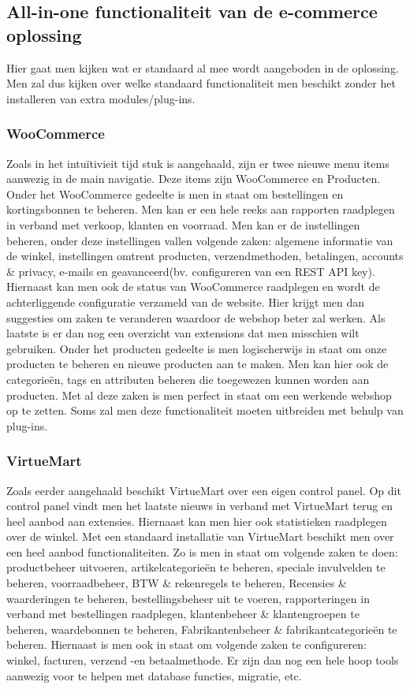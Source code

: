 \subsection{All-in-one functionaliteit van de e-commerce oplossing}
Hier gaat men kijken wat er standaard al mee wordt aangeboden in de oplossing. Men zal dus kijken over welke standaard functionaliteit men beschikt zonder het installeren van extra modules/plug-ins.
\subsubsection{WooCommerce}
Zoals in het intuïtivieit tijd stuk is aangehaald, zijn er twee nieuwe menu items aanwezig in de main navigatie. Deze items zijn WooCommerce en Producten. Onder het WooCommerce gedeelte is men in staat om bestellingen en kortingsbonnen te beheren. Men kan er een hele reeks aan rapporten raadplegen in verband met verkoop, klanten en voorraad. Men kan er de instellingen beheren, onder deze instellingen vallen volgende zaken: algemene informatie van de winkel, instellingen omtrent producten, verzendmethoden, betalingen, accounts \& privacy, e-mails en geavanceerd(bv. configureren van een REST API key). Hiernaast kan men ook de status van WooCommerce raadplegen en wordt de achterliggende configuratie verzameld van de website. Hier krijgt men dan suggesties om zaken te veranderen waardoor de webshop beter zal werken. Als laatste is er dan nog een overzicht van extensions dat men misschien wilt gebruiken. Onder het producten gedeelte is men logischerwijs in staat om onze producten te beheren en nieuwe producten aan te maken. Men kan hier ook de categorieën, tags en attributen beheren die toegewezen kunnen worden aan producten. Met al deze zaken is men perfect in staat om een werkende webshop op te zetten. Soms zal men deze functionaliteit moeten uitbreiden met behulp van plug-ins.

\subsubsection{VirtueMart}
Zoals eerder aangehaald beschikt VirtueMart over een eigen control panel. Op dit control panel vindt men het laatste nieuws in verband met VirtueMart terug en heel aanbod aan extensies. Hiernaast kan men hier ook statistieken raadplegen over de winkel. Met een standaard installatie van VirtueMart beschikt men over een heel aanbod functionaliteiten. Zo is men in staat om volgende zaken te doen: productbeheer uitvoeren, artikelcategorieën te beheren, speciale invulvelden te beheren, voorraadbeheer, BTW \& rekenregels te beheren, Recensies \& waarderingen te beheren, bestellingsbeheer uit te voeren, rapporteringen in verband met bestellingen raadplegen, klantenbeheer \& klantengroepen te beheren, waardebonnen te beheren, Fabrikantenbeheer \& fabrikantcategorieën te beheren. Hiernaast is men ook in staat om volgende zaken te configureren: winkel, facturen, verzend -en betaalmethode. Er zijn dan nog een hele hoop tools aanwezig voor te helpen met database functies, migratie, etc.


